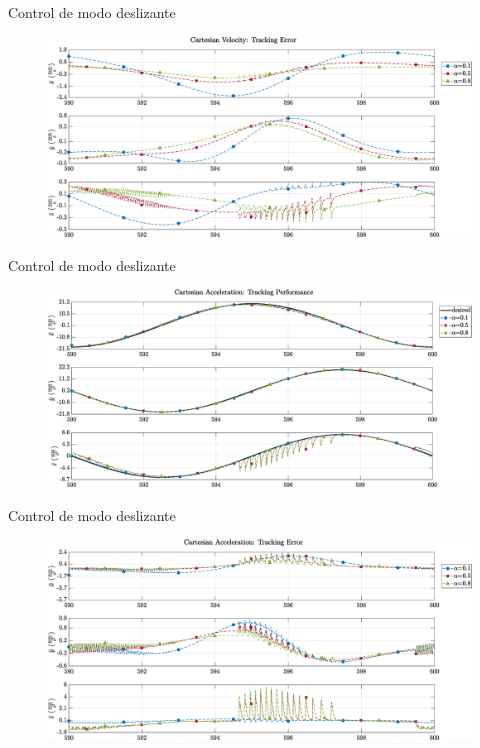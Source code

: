 \documentclass[10pt]{beamer} %
\begin{document}
	\begin{frame}[fragile]{Control de modo deslizante}
		\begin{figure}
			\centering
			\hspace*{-0.5cm}\includegraphics[width=1.1\textwidth]{img/SMCi/circular_traj/600_seg/articular_SMCi_vel_xyz_error_compare.eps}
		\end{figure}
	\end{frame}
	
	
	\begin{frame}[fragile]{Control de modo deslizante}
		\begin{figure}
			\centering
			\hspace*{-0.5cm}\includegraphics[width=1.1\textwidth]{img/SMCi/circular_traj/600_seg/articular_SMCi_accel_xyz_compare.eps}
		\end{figure}
	\end{frame}
	
	\begin{frame}[fragile]{Control de modo deslizante}
		\begin{figure}
			\centering
			\hspace*{-0.5cm}\includegraphics[width=1.1\textwidth]{img/SMCi/circular_traj/600_seg/articular_SMCi_accel_xyz_error_compare.eps}
		\end{figure}
	\end{frame}
	
\end{document}
